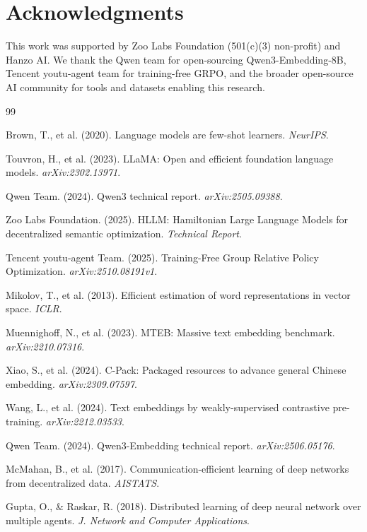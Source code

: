 \documentclass[11pt,a4paper]{article}
\begin{document}
\section*{Acknowledgments}

This work was supported by Zoo Labs Foundation (501(c)(3) non-profit) and Hanzo AI. We thank the Qwen team for open-sourcing Qwen3-Embedding-8B, Tencent youtu-agent team for training-free GRPO, and the broader open-source AI community for tools and datasets enabling this research.

\begin{thebibliography}{99}

Brown, T., et al. (2020). Language models are few-shot learners. \textit{NeurIPS}.

Touvron, H., et al. (2023). LLaMA: Open and efficient foundation language models. \textit{arXiv:2302.13971}.

Qwen Team. (2024). Qwen3 technical report. \textit{arXiv:2505.09388}.

Zoo Labs Foundation. (2025). HLLM: Hamiltonian Large Language Models for decentralized semantic optimization. \textit{Technical Report}.

Tencent youtu-agent Team. (2025). Training-Free Group Relative Policy Optimization. \textit{arXiv:2510.08191v1}.

Mikolov, T., et al. (2013). Efficient estimation of word representations in vector space. \textit{ICLR}.

Muennighoff, N., et al. (2023). MTEB: Massive text embedding benchmark. \textit{arXiv:2210.07316}.

Xiao, S., et al. (2024). C-Pack: Packaged resources to advance general Chinese embedding. \textit{arXiv:2309.07597}.

Wang, L., et al. (2024). Text embeddings by weakly-supervised contrastive pre-training. \textit{arXiv:2212.03533}.

Qwen Team. (2024). Qwen3-Embedding technical report. \textit{arXiv:2506.05176}.

McMahan, B., et al. (2017). Communication-efficient learning of deep networks from decentralized data. \textit{AISTATS}.

Gupta, O., \& Raskar, R. (2018). Distributed learning of deep neural network over multiple agents. \textit{J. Network and Computer Applications}.


\end{thebibliography}
\end{document}
